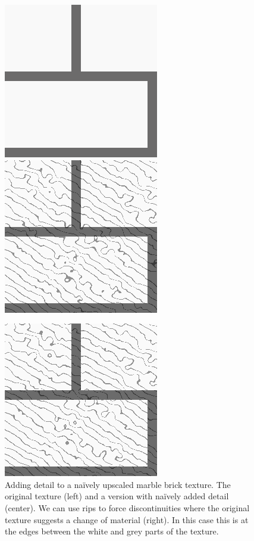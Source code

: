 \documentclass{utue} %
\begin{document}
\begin{figure}[ht]
  \centering
  \includegraphics[width=0.49\linewidth]{images/brick}
  \includegraphics[width=0.49\linewidth]{images/brickSimple}

  \vspace{2pt}

  \includegraphics[width=0.49\linewidth]{images/brickRespecting}
  \caption{Adding detail to a na\"ively upscaled marble brick texture. The original texture (left) and a version with na\"ively added detail (center). We can use rips to force discontinuities where the original texture suggests a change of material (right). In this case this is at the edges between the white and grey parts of the texture.}\label{fig:bricks}
\end{figure}
\end{document}
